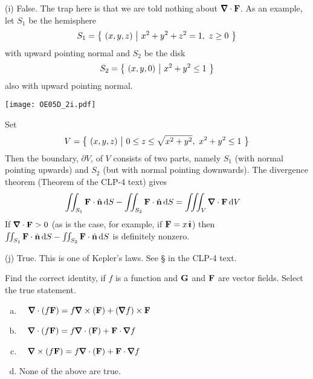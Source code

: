 \begin{solution}
(i) False. The trap here is that we are told nothing about $\vnabla\cdot\vF$.
As an example, let $S_1$ be the hemisphere
\begin{equation*}
S_1=\big\{ \ (x,y,z)\ \big|\ x^2+y^2+z^2=1,\ z\ge 0\ \big\}
\end{equation*}
with upward pointing normal and $S_2$ be the disk
\begin{equation*}
S_2=\big\{ \ (x,y,0)\ \big|\ x^2+y^2\le 1\ \big\}
\end{equation*}
also with upward pointing normal.

\begin{center}
       \texttt{[image: OE05D\_2i.pdf]}
\end{center}

Set
\begin{equation*}
V=\big\{ \ (x,y,z)\ \big|\ 0\le z\le \sqrt{x^2+y^2},\ x^2+y^2\le 1\ \big\}
\end{equation*}
Then the boundary, $\partial V$, of $V$ consists of two parts, namely $S_1$
(with normal pointing upwards) and $S_2$ (but with normal pointing downwards).  The divergence theorem (Theorem  of the CLP-4 text) 
gives
\begin{align*}
\dblInt_{S_1} \vF \cdot \hn\,\dee{S}
-\dblInt_{S_2} \vF \cdot \hn\,\dee{S}
&=\tripInt_V \vnabla\cdot\vF\,\dee{V}
\end{align*}
If $\vnabla\cdot\vF>0$ (as is the case, for example, if $\mathbf{F}=x\,\hat{\pmb{\imath}}$)
then $\iint_{S_1} \mathbf{F} \cdot \hat{\mathbf{n}}\,\mathrm{d}S
-\iint_{S_2} \mathbf{F} \cdot \hat{\mathbf{n}}\,\mathrm{d}S$ is definitely nonzero.

(j) True. This is one of Kepler's laws. See \S{}
in the CLP-4 text.


\end{solution}

\begin{question}[M317 2005D] %
Find the correct identity, if $f$ is a function and $\mathbf{G}$ and $\mathbf{F}$ 
are vector fields. Select the true statement.
\begin{enumerate}[(a)]
\item\ \ 
$\vnabla\cdot(f \vF) = f \vnabla\times(\vF) + (\vnabla f ) \times\vF$
\item\ \ 
$\vnabla\cdot(f \vF) = f \vnabla\cdot(\vF) + \vF\cdot \vnabla f$
\item\ \ 
$\vnabla\times(f \vF) = f \vnabla\cdot(\vF) + \vF\cdot \vnabla f$
\item
None of the above are true.
\end{enumerate}
\end{question}

